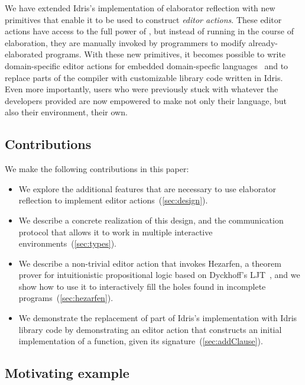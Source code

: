 We have extended Idris's implementation of elaborator reflection with
new primitives that enable it to be used to construct \emph{editor
  actions}. These editor actions have access to the full power of
\Elab{}, but instead of running in the course of elaboration, they are
manually invoked by programmers to modify already-elaborated programs.
With these new primitives, it becomes possible to write
domain-specific editor actions for embedded domain-specfic
languages~\citep{dsel} and to replace parts of the compiler with
customizable library code written in Idris. Even more importantly,
users who were previously stuck with whatever the developers provided
are now empowered to make not only their language, but also their
environment, their own.

\subsection*{Contributions}

We make the following contributions in this paper:
\begin{itemize}
\item We explore the additional features that are necessary to use
  elaborator reflection to implement editor actions~(\autoref{sec:design}).
\item We describe a concrete realization of this design, and the
  communication protocol that allows it to work in multiple
  interactive environments~(\autoref{sec:types}).
\item We describe a non-trivial editor action that invokes Hezarfen, a
  theorem prover for intuitionistic propositional logic based on
  Dyckhoff's LJT~\cite{ljt}, and we show how to use it to
  interactively fill the holes found in incomplete
  programs~(\autoref{sec:hezarfen}).
\item We demonstrate the replacement of part of Idris's implementation
  with Idris library code by demonstrating an editor action that
  constructs an initial implementation of a function, given its
  signature~(\autoref{sec:addClause}).
\end{itemize}


\subsection{Motivating example}


